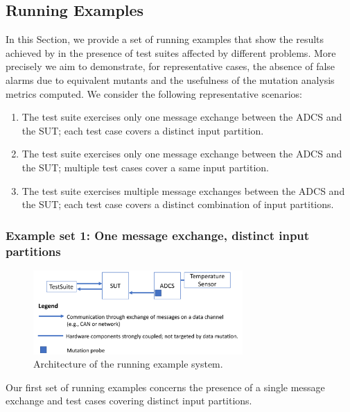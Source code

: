 \clearpage
\subsection{Running Examples}
\label{sec:dataDriven:example}

In this Section, we provide a set of running examples that show the results achieved by \APPR in the presence of test suites affected by different problems. More precisely we aim to demonstrate, for representative cases, the absence of false alarms due to equivalent mutants and the usefulness of the mutation analysis metrics computed.
We consider the following representative scenarios:
\begin{enumerate}
\item The test suite exercises only one message exchange between the ADCS and the SUT; each test case covers a distinct input partition.
\item The test suite exercises only one message exchange between the ADCS and the SUT; multiple test cases cover a same input partition.
\item The test suite exercises multiple message exchanges between the ADCS and the SUT; each test case covers a distinct combination of input partitions.
\end{enumerate}


\subsubsection{Example set 1: One message exchange, distinct input partitions}
\label{sec:dataDriven:example:1}

\begin{figure}[tb]
\centering
\includegraphics[width=8cm]{damat/RunningExampleArch}
\caption{Architecture of the running example system.}
\label{fig:damat:RunningExampleArch}
\end{figure}

Our first set of running examples concerns the presence of a single message exchange and test cases covering distinct input partitions.

